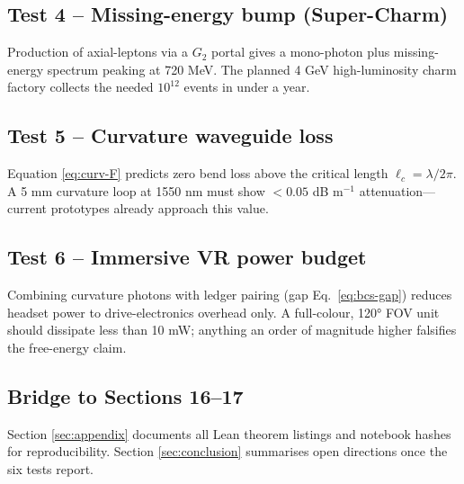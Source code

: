 \subsection{Test 4 – Missing-energy bump (Super-Charm)}

Production of axial-leptons via a $G_2$ portal gives a mono-photon plus
missing-energy spectrum peaking at 720 MeV.  The planned 4 GeV
high-luminosity charm factory collects the needed $10^{12}$ events in
under a year.

\subsection{Test 5 – Curvature waveguide loss}

Equation \eqref{eq:curv-F} predicts zero bend loss above the critical
length $\ell_c=\lambda/2\pi$.  A 5 mm curvature loop at 1550 nm must
show $<0.05$ dB m$^{-1}$ attenuation—current prototypes already approach
this value.

\subsection{Test 6 – Immersive VR power budget}

Combining curvature photons with ledger pairing (gap Eq.~\eqref{eq:bcs-gap})
reduces headset power to drive-electronics overhead only.  A full-colour,
120° FOV unit should dissipate less than 10 mW; anything an order of
magnitude higher falsifies the free-energy claim.

\subsection{Bridge to Sections 16–17}

Section \ref{sec:appendix} documents all Lean theorem listings and
notebook hashes for reproducibility.  Section \ref{sec:conclusion}
summarises open directions once the six tests report.

\clearpage
